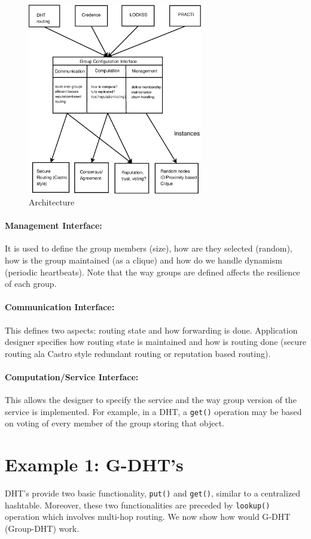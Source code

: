 \begin{figure} 
\begin{center} 
\includegraphics[width=3in]{thin-waist.eps} 
\end{center} 
\caption{Architecture}
\label{fig:thin-waist} 
\end{figure}

\paragraph{Management Interface:} It is used to define the group members (size), how are they selected (random), how is the group maintained (as a clique) and how do we handle dynamism (periodic heartbeats). Note that the way groups are defined affects the resilience of each group.

\paragraph{Communication Interface:} This defines two aspects: routing state and how forwarding is done. Application designer specifies how routing state is maintained and how is routing done (secure routing ala Castro style redundant routing or reputation based routing).

\paragraph{Computation/Service Interface:} This allows the designer to specify the service and the way group version of the service is implemented. For example, in a DHT, a \texttt{get()} operation may be based on voting of every member of the group storing that object.


\section{Example 1: G-DHT's}
DHT's provide two basic functionality, \texttt{put()} and \texttt{get()}, similar to a centralized hashtable. Moreover, these two functionalities are preceded by \texttt{lookup()} operation which involves multi-hop routing. We now show how would G-DHT (Group-DHT) work.

